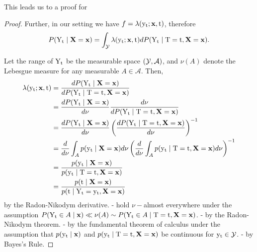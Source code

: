 This leads us to a proof for 
\begin{proof}
    \label{proof:density_ratio}
    Further, in our setting we have $f = \lambda(\yt; \x, \tf)$, therefore
    \begin{equation}
        P(\Yt \mid \X=\x) = \int_{\Ycal} \lambda(\yt; \x, \tf) dP(\Yt \mid \Tf=\tf, \X=\x).
    \end{equation}
    
    Let the range of $\Yt$ be the measurable space $(\Ycal, \mathcal{A})$, and $\nu(A)$ denote the Lebesgue measure for any measurable $A \in \mathcal{A}$. 
    Then,
    \begin{subequations}
        \label{eq:dr_proof}
        \begin{align}
            \lambda(\yt; \x, \tf)
            &=\frac{dP(\Yt \mid \X=\x)}{dP(\Yt \mid \Tf=\tf, \X=\x)} \label{eq:dr_proof_a}\\
            &= \frac{dP(\Yt \mid \X=\x)}{d\nu}\frac{d\nu}{dP(\Yt \mid \Tf=\tf, \X=\x)} \label{eq:dr_proof_b} \\
            &= \frac{dP(\Yt \mid \X=\x)}{d\nu}\left(\frac{dP(\Yt \mid \Tf=\tf, \X=\x)}{d\nu}\right)^{-1} \label{eq:dr_proof_c} \\
            &= \frac{d}{d\nu} \int_{A}p(\yt \mid \X=\x)d\nu \left(\frac{d}{d\nu} \int_{A}p(\yt \mid \Tf=\tf, \X=\x)d\nu\right)^{-1} \label{eq:dr_proof_d} \\
            &= \frac{p(\yt \mid \X=\x)}{p(\yt \mid \Tf=\tf, \X=\x)} \label{eq:dr_proof_e} \\
            &= \frac{p(\tf \mid \X=\x)}{p(\tf \mid \Yt=\yt, \X=\x)} \label{eq:dr_proof_f}
        \end{align}
    \end{subequations}
     by the Radon-Nikodym derivative.
    - hold $\nu-$almost everywhere under the assumption $P(\Yt \in A \mid \x) \ll \nu(A) \sim P(\Yt \in A \mid \Tf=\tf, \X=\x)$.
    - by the Radon-Nikodym theorem.
    - by the fundamental theorem of calculus under the assumption that $p(\yt \mid \x)$ and $p(\yt \mid \Tf=\tf, \X=\x)$ be continuous for $\yt \in \Ycal$.
    - by Bayes's Rule.
\end{proof}

